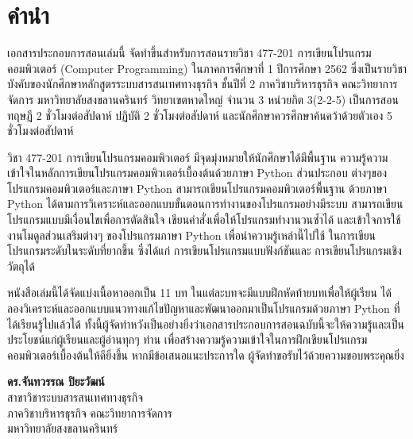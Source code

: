 \chapter{คำนำ}

\begin{markdown}

เอกสารประกอบการสอนเล่มนี้ จัดทำขึ้นสำหรับการสอนรายวิชา 477-201 การเขียนโปรแกรม คอมพิวเตอร์ (Computer Programming) ในภาคการศึกษาที่ 1 ปีการศึกษา 2562 ซึ่งเป็นรายวิชาบังคับของนักศึกษาหลักสูตรระบบสารสนเทศทางธุรกิจ ชั้นปีที่ 2 ภาควิชาบริหารธุรกิจ คณะวิทยาการจัดการ มหาวิทยาลัยสงขลานครินทร์ วิทยาเขตหาดใหญ่ จำนวน 3 หน่วยกิต 3(2-2-5) เป็นการสอนทฤษฎี 2 ชั่วโมงต่อสัปดาห์ ปฏิบัติ 2 ชั่วโมงต่อสัปดาห์ และนักศึกษาควรศึกษาค้นคว้าด้วยตัวเอง 5 ชั่วโมงต่อสัปดาห์

วิชา 477-201 การเขียนโปรแกรมคอมพิวเตอร์ มีจุดมุ่งหมายให้นักศึกษาได้มีพื้นฐาน ความรู้ความเข้าใจในหลักการเขียนโปรแกรมคอมพิวเตอร์เบื้องต้นด้วยภาษา Python ส่วนประกอบ ต่างๆของโปรแกรมคอมพิวเตอร์และภาษา Python สามารถเขียนโปรแกรมคอมพิวเตอร์พื้นฐาน ด้วยภาษา Python ได้ตามการวิเคราะห์และออกแบบขั้นตอนการทำงานของโปรแกรมอย่างมีระบบ สามารถเขียนโปรแกรมแบบมีเงื่อนไขเพื่อการตัดสินใจ เขียนคำสั่งเพื่อให้โปรแกรมทำงานวนซ้ำได้ และเข้าใจการใช้งานโมดูลส่วนเสริมต่างๆ ของโปรแกรมภาษา Python เพื่อนำความรู้เหล่านี้ไปใช้ ในการเขียนโปรแกรมระดับในระดับที่ยากขึ้น ซึ่งได้แก่ การเขียนโปรแกรมแบบฟังก์ชันและ การเขียนโปรแกรมเชิงวัตถุได้

หนังสือเล่มนี้ได้จัดแบ่งเนื้อหาออกเป็น 11 บท ในแต่ละบทจะมีแบบฝึกหัดท้ายบทเพื่อให้ผู้เรียน ได้ลองวิเคราะห์และออกแบบแนวทางแก้ไขปัญหาและพัฒนาออกมาเป็นโปรแกรมด้วยภาษา Python ที่ได้เรียนรู้ไปแล้วได้ ทั้งนี้ผู้จัดทำหวังเป็นอย่างยิ่งว่าเอกสารประกอบการสอนฉบับนี้จะให้ความรู้และเป็นประโยชน์แก่ผู้เรียนและผู้อ่านทุกๆ ท่าน เพื่อสร้างความรู้ความเข้าใจในการฝึกเขียนโปรแกรมคอมพิวเตอร์เบื้องต้นให้ดียิ่งขึ้น หากมีข้อเสนอแนะประการใด ผู้จัดทำขอรับไว้ด้วยความขอบพระคุณยิ่ง

\end{markdown}

\vspace{1cm}
\noindent
\textbf{ดร.จันทวรรณ ปิยะวัฒน์}\\
สาขาวิชาระบบสารสนเทศทางธุรกิจ\\
ภาควิชาบริหารธุรกิจ คณะวิทยาการจัดการ\\
มหาวิทยาลัยสงขลานครินทร์